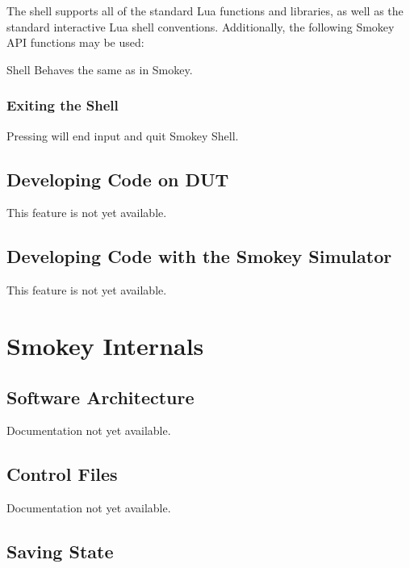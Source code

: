 \documentclass[11pt]{article}
\begin{document}
The shell supports all of the standard Lua functions and libraries, as well as
the standard interactive Lua shell conventions.  Additionally, the following
Smokey API functions may be used:

\begin{Definition}

\item[Shell] Behaves the same as in Smokey.

\end{Definition}

\subsubsection{Exiting the Shell}

Pressing \keys{\ctrl} will end input and quit Smokey Shell.

\subsection{Developing Code on DUT}

This feature is not yet available.

\subsection{Developing Code with the Smokey Simulator}

This feature is not yet available.

\section{Smokey Internals}

\subsection{Software Architecture}

Documentation not yet available.

\subsection{Control Files}

Documentation not yet available.

\subsection{Saving State}
\end{document}
